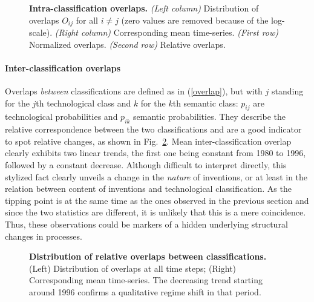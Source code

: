 \documentclass[10pt,A4,draft]{article}
\begin{document}
\begin{figure}[!ht]
\centering
\caption{
\textbf{Intra-classification overlaps.}
\textit{(Left column)} Distribution of overlaps $O_{ij}$ for all $i\neq j$ (zero values are removed because of the log-scale). \textit{(Right column)} Corresponding mean time-series. \textit{(First row)} Normalized overlaps. \textit{(Second row)} Relative overlaps.}
\label{fig:intra-classif-overlap}
\end{figure}


\paragraph{Inter-classification overlaps}

Overlaps \emph{between} classifications are defined as in (\ref{overlap}), but with $j$ standing for the $j$th technological class and $k$ for the $k$th semantic class: $p_{ij}$ are technological probabilities and $p_{ik}$ semantic probabilities. They describe the relative correspondence between the two classifications and are a good indicator to spot relative changes, as shown in Fig.~\ref{fig:inter-classif-overlap}. Mean inter-classification overlap clearly exhibits two linear trends, the first one being constant from 1980 to 1996, followed by a constant decrease. Although difficult to interpret directly, this stylized fact clearly unveils a change in the \emph{nature} of inventions, or at least in the relation between content of inventions and technological classification. As the tipping point is at the same time as the ones observed in the previous section and since the two statistics are different, it is unlikely that this is a mere coincidence. Thus, these observations could be markers of a hidden underlying structural changes in processes. 




\begin{figure}[!ht]
\caption{\textbf{Distribution of relative overlaps between classifications.} (Left) Distribution of overlaps at all time steps; (Right) Corresponding mean time-series. The decreasing trend starting around 1996 confirms a qualitative regime shift in that period.}
\label{fig:inter-classif-overlap}
\end{figure}
\end{document}

